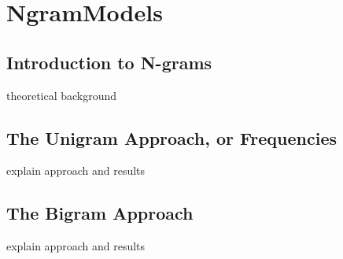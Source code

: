 \chapter{NgramModels}
\label{chap:NgramModels}

\section{Introduction to N-grams}
theoretical background

\section{The Unigram Approach, or Frequencies}
explain approach and results

\section{The Bigram Approach}
explain approach and results